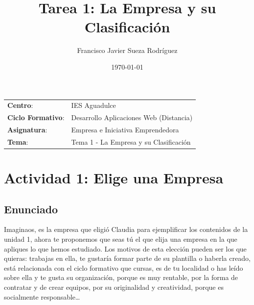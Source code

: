 


\title{
\vspace{10ex}
\normalfont \normalsize
\huge \textbf{Tarea 1: La Empresa y su Clasificación}
}
\author{Francisco Javier Sueza Rodríguez}
\date{\normalsize\today}



\maketitle

\thispagestyle{empty}

\vspace{75ex}

\begin{center}
    \begin{tabular}{l l}
        \textbf{Centro}: & IES Aguadulce \\
        \textbf{Ciclo Formativo}: & Desarrollo Aplicaciones Web (Distancia)\\
        \textbf{Asignatura}: & Empresa e Iniciativa Emprendedora\\
        \textbf{Tema}: & Tema 1 -  La Empresa y su Clasificación\\
    \end{tabular}
\end{center}

\newpage

\section{Actividad 1: Elige una Empresa}

\subsection{Enunciado}
Imaginaos, es la empresa que eligió Claudia para ejemplificar los contenidos de la unidad 1, ahora te proponemos que seas tú el que elija una empresa en la que apliques lo que hemos estudiado. Los motivos de esta elección pueden ser los que quieras: trabajas en ella, te gustaría formar parte de su plantilla o haberla creado, está relacionada con el ciclo formativo que cursas, es de tu localidad o has leído sobre ella y te gusta su organización, porque es muy rentable, por la forma de contratar y de crear equipos, por su originalidad y creatividad, porque es socialmente responsable…

